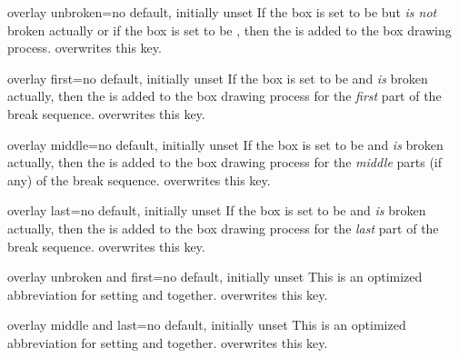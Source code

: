 \begin{docTcbKey}{overlay unbroken}{=}{no default, initially unset}
  If the box is set to be  but \emph{is not} broken actually
  or if the box is set to be ,
  then the  is added to the box drawing process.
   overwrites this key.
\end{docTcbKey}

\begin{docTcbKey}{overlay first}{=}{no default, initially unset}
  If the box is set to be  and \emph{is} broken actually,
  then the  is added to the box drawing process for
  the \emph{first} part of the break sequence.
   overwrites this key.
\end{docTcbKey}

\begin{docTcbKey}{overlay middle}{=}{no default, initially unset}
  If the box is set to be  and \emph{is} broken actually,
  then the  is added to the box drawing process for
  the \emph{middle} parts (if any) of the break sequence.
   overwrites this key.
\end{docTcbKey}

\begin{docTcbKey}{overlay last}{=}{no default, initially unset}
  If the box is set to be  and \emph{is} broken actually,
  then the  is added to the box drawing process for
  the \emph{last} part of the break sequence.
   overwrites this key.
\end{docTcbKey}

\begin{docTcbKey}{overlay unbroken and first}{=}{no default, initially unset}
  This is an optimized abbreviation for setting
   and
   together.
   overwrites this key.
\end{docTcbKey}

\begin{docTcbKey}{overlay middle and last}{=}{no default, initially unset}
  This is an optimized abbreviation for setting
   and
   together.
   overwrites this key.
\end{docTcbKey}

